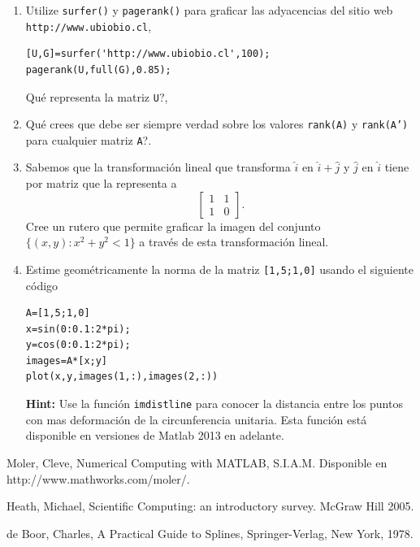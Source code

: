 \documentclass[12pt,letterpaper]{article}
\begin{document}
\begin{enumerate}
\item Utilize \texttt{surfer()} y \texttt{pagerank()} para graficar las adyacencias del sitio web \texttt{http://www.ubiobio.cl},
\begin{verbatim}
[U,G]=surfer('http://www.ubiobio.cl',100);
pagerank(U,full(G),0.85);
\end{verbatim}
\textquestiondown Qu\'e representa la matriz \texttt{U}?, 

\item \textquestiondown Qu\'e crees que debe ser siempre verdad sobre los valores \texttt{rank(A)} y \texttt{rank(A')} para cualquier matriz \texttt{A}?.

\item Sabemos que la transformaci\'on lineal que transforma $\hat{i}$ en $\hat{i} + \hat{j}$ y $\hat{j}$ en $\hat{i}$ tiene por matriz que la representa a 
$$
\begin{bmatrix}
1 & 1 \\
1 & 0
\end{bmatrix}.
$$
Cree un rutero que permite graficar la imagen del conjunto $\{(x,y):x^2+y^2<1\}$  a trav\'es de esta transformaci\'on lineal.

\item Estime geom\'etricamente la norma de la matriz \texttt{[1,5;1,0]} usando el siguiente c\'odigo
\begin{verbatim}
A=[1,5;1,0]
x=sin(0:0.1:2*pi);
y=cos(0:0.1:2*pi);
images=A*[x;y]
plot(x,y,images(1,:),images(2,:))
\end{verbatim}

\textbf{Hint:} Use la funci\'on \texttt{imdistline} para conocer la distancia entre los puntos con mas deformaci\'on de la circunferencia unitaria. Esta funci\'on est\'a disponible en versiones de Matlab 2013 en adelante.

\end{enumerate}


\begin{thebibliography}{9}


 Moler, Cleve, Numerical Computing with MATLAB, S.I.A.M. Disponible en http://www.mathworks.com/moler/.

 Heath, Michael, Scientific Computing: an introductory survey. McGraw Hill 2005.

 de Boor, Charles, A Practical Guide to Splines, Springer-Verlag, New York, 1978.


\end{thebibliography}
\end{document}
